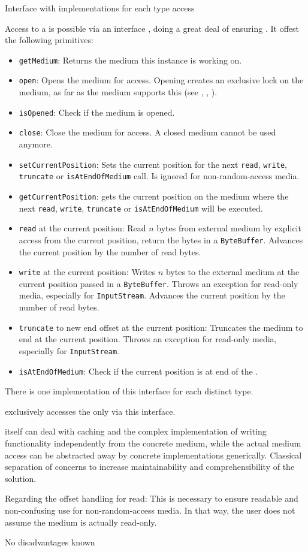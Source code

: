 {%
Interface \IMediumAccessor{} with implementations for each \TERMmedia{} type access
}
{%
Access to a \TERMmedium{} is possible via an interface \IMediumAccessor{}, doing a great deal of ensuring . It offest the following primitives:
\begin{itemize}
\item \texttt{getMedium}: Returns the medium this instance is working on.
\item \texttt{open}: Opens the medium for access. Opening creates an exclusive lock on the medium, as far as the medium supports this (see , , ).
\item \texttt{isOpened}: Check if the medium is opened.
\item \texttt{close}: Close the medium for access. A closed medium cannot be used anymore.
\item \texttt{setCurrentPosition}: Sets the current position for the next \texttt{read}, \texttt{write}, \texttt{truncate} or \texttt{isAtEndOfMedium} call. Is ignored for non-random-access media.
\item \texttt{getCurrentPosition}: gets the current position on the medium where the next \texttt{read}, \texttt{write}, \texttt{truncate} or \texttt{isAtEndOfMedium} will be executed.
\item \texttt{read} at the current position: Read $n$ bytes from external medium by explicit access from the current position, return the bytes in a \texttt{ByteBuffer}. Advances the current position by the number of read bytes.
\item \texttt{write} at the current position: Writes $n$ bytes to the external medium at the current position passed in a \texttt{ByteBuffer}. Throws an exception for read-only media, especially for \texttt{InputStream}. Advances the current position by the number of read bytes.
\item \texttt{truncate} to new end offset at the current position: Truncates the medium to end at the current position. Throws an exception for read-only media, especially for \texttt{InputStream}.
\item \texttt{isAtEndOfMedium}: Check if the current position is at end of the \TERMmedium{}.
\end{itemize}

There is one implementation of this interface for each distinct \TERMmedium{} type.

\IMediumStore{} exclusively accesses the \TERMmedium{} only via this interface.
}
{%
\IMediumStore{} itself can deal with caching and the complex implementation of writing functionality independently from the concrete medium, while the actual medium access can be abstracted away by concrete implementations generically. Classical separation of concerns to increase maintainability and comprehensibility of the solution.

Regarding the offset handling for read: This is necessary to ensure readable and non-confusing use for non-random-access media. In that way, the user does not assume the medium is actually read-only.
}
{%
No disadvantages known
}

